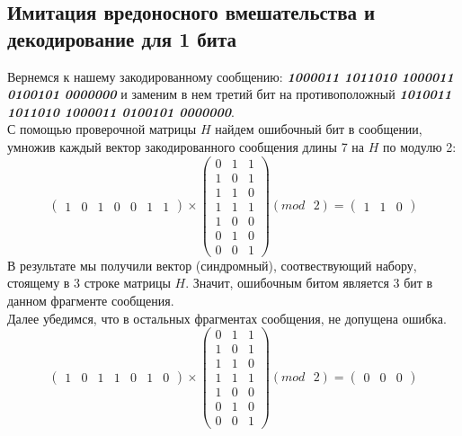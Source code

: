 \documentclass[a5paper, 10pt]{article}
\theoremstyle{definition}
\theoremstyle{plain}
\theoremstyle{remark}
\begin{document}
\subsection{Имитация вредоносного вмешательства и декодирование для 1 бита}
Вернемся к нашему закодированному сообщению:  \textbf{\textit{10\colorbox[rgb]{0.50, 0.5, 0.5}{0}0011 1011010 1000011 0100101 0000000}} и заменим в нем третий бит на противоположный  \textbf{\textit{10\colorbox[rgb]{0.4, 0.8, 0.8}{1}0011 1011010 1000011 0100101 0000000}}.\\
С помощью проверочной матрицы $H$ найдем ошибочный бит в сообщении, умножив каждый вектор закодированного сообщения длины 7 на $H$ по модулю 2:
\begin{equation}
\begin{pmatrix}
1 & 0 & 1 & 0 & 0 & 1 & 1
\end{pmatrix}
 \times
\begin{pmatrix}
0 & 1 & 1\\
1 & 0 & 1\\
1 & 1 & 0\\
1 & 1 & 1 \\
1 & 0 & 0\\
0 & 1 & 0 \\
0 & 0 & 1
\end{pmatrix}
(mod \text{ }2)
= \begin{pmatrix}
1 & 1 & 0 
\end{pmatrix}
\end{equation}
В результате мы получили вектор (синдромный), соотвествующий набору, стоящему в 3 строке матрицы $H$. Значит, ошибочным битом является 3 бит в данном фрагменте сообщения.\\
Далее убедимся, что в остальных фрагментах сообщения, не допущена ошибка.
\begin{equation}
\begin{pmatrix}
1 & 0 & 1 & 1 & 0 & 1 & 0
\end{pmatrix}
 \times
\begin{pmatrix}
0 & 1 & 1\\
1 & 0 & 1\\
1 & 1 & 0\\
1 & 1 & 1 \\
1 & 0 & 0\\
0 & 1 & 0 \\
0 & 0 & 1
\end{pmatrix}
(mod \text{ }2)
= \begin{pmatrix}
0 & 0 & 0 
\end{pmatrix}
\end{equation}
\end{document}
